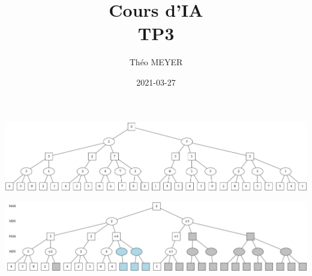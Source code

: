 \documentclass[11pt]{article}
\author{Théo MEYER}
\date{2021-03-27}
\title{Cours d'IA\\\medskip
\large TP3}
\begin{document}
\maketitle
\begin{center}
\includegraphics[width=.9\linewidth]{min_max.png}
\end{center}


\begin{center}
\includegraphics[width=.9\linewidth]{alpha_beta.png}
\end{center}
\end{document}
